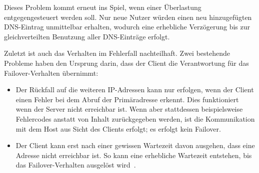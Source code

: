 Dieses Problem kommt erneut ins Spiel, wenn einer Überlastung entgegengesteuert werden soll.
Nur neue Nutzer würden einen neu hinzugefügten DNS-Eintrag unmittelbar erhalten, wodurch eine erhebliche Verzögerung bis zur gleichverteilten Benutzung aller DNS-Einträge erfolgt.

Zuletzt ist auch das Verhalten im Fehlerfall nachteilhaft.
Zwei bestehende Probleme haben den Ursprung darin, dass der Client die Verantwortung für das Failover-Verhalten übernimmt:
\begin{itemize}
	\item Der Rückfall auf die weiteren IP-Adressen kann nur erfolgen, wenn der Client einen Fehler bei dem Abruf der Primäradresse erkennt. Dies funktioniert wenn der Server nicht erreichbar ist. Wenn aber stattdessen beispielsweise Fehlercodes anstatt von Inhalt zurückgegeben werden, ist die Kommunikation mit dem Host aus Sicht des Clients erfolgt; es erfolgt kein Failover.
	\item Der Client kann erst nach einer gewissen Wartezeit davon ausgehen, dass eine Adresse nicht erreichbar ist. So kann eine erhebliche Wartezeit entstehen, bis das Failover-Verhalten ausgelöst wird~\cite{so-dns-slow}.%
\end{itemize}
